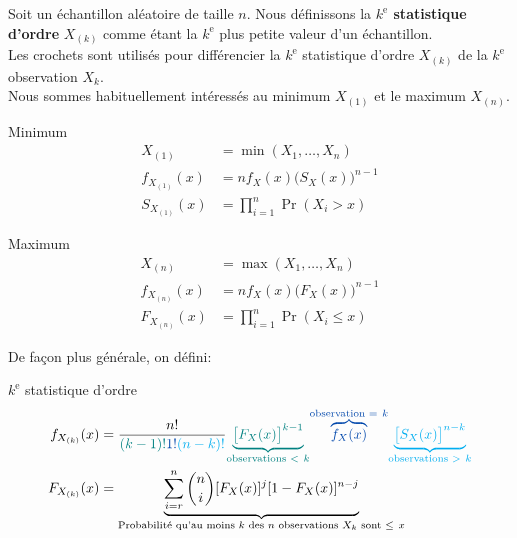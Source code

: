 \documentclass[10pt, french]{article}
\begin{document}
\begin{multicols*}{2}
Soit un échantillon aléatoire de taille $n$.
Nous définissons la \textbf{$k^{\text{e}}$ statistique d'ordre} $X_{(k)}$ comme étant la $k^{\text{e}}$ plus petite valeur d'un échantillon.\\
Les crochets sont utilisés pour différencier la $k^{\text{e}}$ statistique d'ordre $X_{(k)}$ de la $k^{\text{e}}$ observation $X_{k}$.\\

Nous sommes habituellement intéressés au minimum $X_{(1)}$ et le maximum $X_{(n)}$.

\setlength{\mathindent}{-0.75cm}
\begin{minipage}{0.5\columnwidth}
\begin{algo}{Minimum}
\begin{align*}
	X_{(1)}
	&=	\min(X_{1}, \dots, X_{n})	\\
	f_{X_{(1)}}(x)
	&=	n f_{X}(x) \big( S_{X}(x) \big)^{n - 1}	\\
	S_{X_{(1)}}(x)
	&=	\prod_{i = 1}^{n} \Pr(X_{i} > x)
\end{align*}
\end{algo}
\end{minipage}
\begin{minipage}{0.5\columnwidth}
\begin{algo}{Maximum}
\begin{align*}
	X_{(n)}
	&=	\max(X_{1}, \dots, X_{n})	\\
	f_{X_{(n)}}(x)
	&=	n f_{X}(x) \big( F_{X}(x) \big)^{n - 1}	\\
	F_{X_{(n)}}(x)
	&=	\prod_{i = 1}^{n} \Pr(X_{i} \le x)
\end{align*}
\end{algo}
\end{minipage}
\setlength{\mathindent}{1cm}

De façon plus générale, on défini:
\begin{algo}{$k^{\text{e}}$ statistique d'ordre}
\begin{align*}
	f_{X_{(k)}}(x)
	&=	\frac{n!}{\textcolor{teal}{(k - 1)!} \textcolor{cobalt}{1!} \textcolor{cyan}{(n - k)!}} \textcolor{teal}{\underset{\text{observations } < \ k}{\underbrace{\big[ F_{X}(x) \big]^{k - 1}}}} \textcolor{cobalt}{\overset{\text{observation } = \ k}{\overbrace{f_{X}(x)}}} \textcolor{cyan}{\underset{\text{observations } > \ k}{\underbrace{\big[ S_{X}(x) \big]^{n - k}}}} \\
	F_{X_{(k)}}(x)
	&=	\underset{\text{Probabilité qu'au moins } k \text{ des } n \text{ observations } X_{k} \text{ sont } \le \ x}{\underbrace{\sum_{i = r}^{n} \binom{n}{i} [F_{X}(x)]^{j} [1 - F_{X}(x)]^{n - j}}}
\end{align*}
\end{algo}


\end{multicols*}
\end{document}
